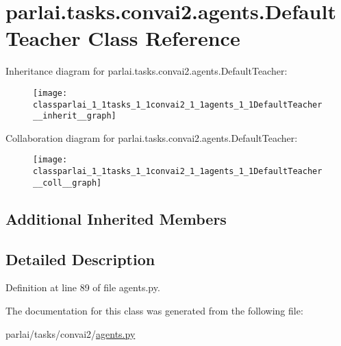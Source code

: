 \hypertarget{classparlai_1_1tasks_1_1convai2_1_1agents_1_1DefaultTeacher}{}\section{parlai.\+tasks.\+convai2.\+agents.\+Default\+Teacher Class Reference}
\label{classparlai_1_1tasks_1_1convai2_1_1agents_1_1DefaultTeacher}


Inheritance diagram for parlai.\+tasks.\+convai2.\+agents.\+Default\+Teacher\+:
\nopagebreak
\begin{figure}[H]
\begin{center}
\leavevmode
\texttt{[image: classparlai\_1\_1tasks\_1\_1convai2\_1\_1agents\_1\_1DefaultTeacher\_\_inherit\_\_graph]}
\end{center}
\end{figure}


Collaboration diagram for parlai.\+tasks.\+convai2.\+agents.\+Default\+Teacher\+:
\nopagebreak
\begin{figure}[H]
\begin{center}
\leavevmode
\texttt{[image: classparlai\_1\_1tasks\_1\_1convai2\_1\_1agents\_1\_1DefaultTeacher\_\_coll\_\_graph]}
\end{center}
\end{figure}
\subsection*{Additional Inherited Members}


\subsection{Detailed Description}


Definition at line 89 of file agents.\+py.



The documentation for this class was generated from the following file\+:\begin{DoxyCompactItemize}
\item 
parlai/tasks/convai2/\hyperlink{parlai_2tasks_2convai2_2agents_8py}{agents.\+py}\end{DoxyCompactItemize}
